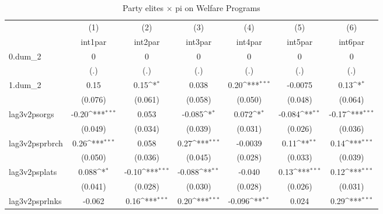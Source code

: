 \begin{table}[htbp]\centering
\def\sym#1{\ifmmode^{#1}\else\(^{#1}\)\fi}
\caption{Party elites $\times$ pi on Welfare Programs}
\begin{tabular}{l*{6}{c}}
\hline\hline
            &\multicolumn{1}{c}{(1)}         &\multicolumn{1}{c}{(2)}         &\multicolumn{1}{c}{(3)}         &\multicolumn{1}{c}{(4)}         &\multicolumn{1}{c}{(5)}         &\multicolumn{1}{c}{(6)}         \\
            &     int1par         &     int2par         &     int3par         &     int4par         &     int5par         &     int6par         \\
\hline
0.dum\_2     &           0         &           0         &           0         &           0         &           0         &           0         \\
            &         (.)         &         (.)         &         (.)         &         (.)         &         (.)         &         (.)         \\
[1em]
1.dum\_2     &        0.15         &        0.15\sym{*}  &       0.038         &        0.20\sym{***}&     -0.0075         &        0.13\sym{*}  \\
            &     (0.076)         &     (0.061)         &     (0.058)         &     (0.050)         &     (0.048)         &     (0.064)         \\
[1em]
lag3v2psorgs&       -0.20\sym{***}&       0.053         &      -0.085\sym{*}  &       0.072\sym{*}  &      -0.084\sym{**} &       -0.17\sym{***}\\
            &     (0.049)         &     (0.034)         &     (0.039)         &     (0.031)         &     (0.026)         &     (0.036)         \\
[1em]
lag3v2psprbrch&        0.26\sym{***}&       0.058         &        0.27\sym{***}&     -0.0039         &        0.11\sym{**} &        0.14\sym{***}\\
            &     (0.050)         &     (0.036)         &     (0.045)         &     (0.028)         &     (0.033)         &     (0.039)         \\
[1em]
lag3v2psplats&       0.088\sym{*}  &       -0.10\sym{***}&      -0.088\sym{**} &      -0.040         &        0.13\sym{***}&        0.12\sym{***}\\
            &     (0.041)         &     (0.028)         &     (0.030)         &     (0.028)         &     (0.026)         &     (0.031)         \\
[1em]
lag3v2psprlnks&      -0.062         &        0.16\sym{***}&        0.20\sym{***}&      -0.096\sym{**} &       0.024         &        0.29\sym{***}\\

\end{tabular}
\end{table}
